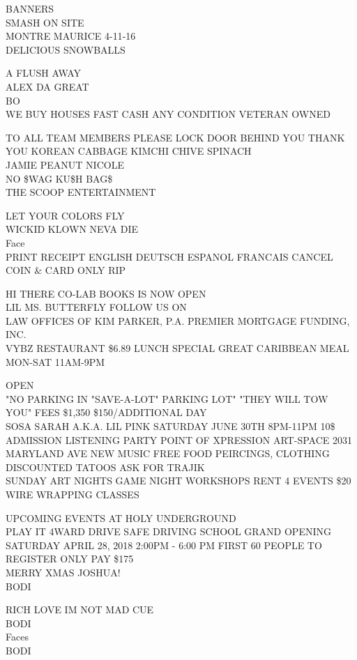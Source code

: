 \documentclass[10pt,letterpaper]{article}
\begin{document}
BANNERS\\
SMASH ON SITE\\
MONTRE MAURICE 4{-}11{-}16\\
DELICIOUS SNOWBALLS

A FLUSH AWAY\\
ALEX DA GREAT\\
BO\\
WE BUY HOUSES FAST CASH ANY CONDITION VETERAN OWNED

TO ALL TEAM MEMBERS PLEASE LOCK DOOR BEHIND YOU THANK YOU KOREAN CABBAGE KIMCHI CHIVE SPINACH\\
JAMIE PEANUT NICOLE\\
NO \$WAG KU\$H BAG\$\\
THE SCOOP ENTERTAINMENT

LET YOUR COLORS FLY\\
WICKID KLOWN NEVA DIE\\
Face\\
PRINT RECEIPT ENGLISH DEUTSCH ESPANOL FRANCAIS CANCEL COIN \& CARD ONLY RIP

HI THERE CO{-}LAB BOOKS IS NOW OPEN\\
LIL MS. BUTTERFLY FOLLOW US ON\\
LAW OFFICES OF KIM PARKER, P.A. PREMIER MORTGAGE FUNDING, INC.\\
VYBZ RESTAURANT \$6.89 LUNCH SPECIAL GREAT CARIBBEAN MEAL MON{-}SAT 11AM{-}9PM

OPEN\\
"NO PARKING IN "SAVE{-}A{-}LOT" PARKING LOT"  "THEY WILL TOW YOU"  FEES \$1,350 \$150/ADDITIONAL DAY\\
SOSA SARAH A.K.A. LIL PINK SATURDAY JUNE 30TH 8PM{-}11PM 10\$ ADMISSION LISTENING PARTY POINT OF XPRESSION ART{-}SPACE 2031 MARYLAND AVE NEW MUSIC FREE FOOD PEIRCINGS, CLOTHING DISCOUNTED TATOOS ASK FOR TRAJIK\\
SUNDAY ART NIGHTS GAME NIGHT WORKSHOPS RENT 4 EVENTS \$20 WIRE WRAPPING CLASSES

UPCOMING EVENTS AT HOLY UNDERGROUND\\
PLAY IT 4WARD DRIVE SAFE DRIVING SCHOOL GRAND OPENING SATURDAY APRIL 28, 2018 2:00PM {-} 6:00 PM FIRST 60 PEOPLE TO REGISTER ONLY PAY \$175\\
MERRY XMAS JOSHUA!\\
BODI

RICH LOVE IM NOT MAD CUE\\
BODI\\
Faces\\
BODI
\end{document}
